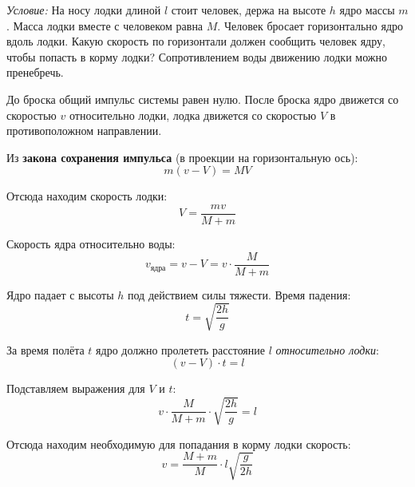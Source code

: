 \documentclass[a4paper,12pt]{article}
\begin{document}

\textit{Условие:} На носу лодки длиной $l$ стоит человек, держа на высоте $h$ ядро массы $m$. Масса лодки вместе с человеком равна $M$. Человек бросает горизонтально ядро вдоль лодки. Какую скорость по горизонтали должен сообщить человек ядру, чтобы попасть в корму лодки? Сопротивлением воды движению лодки можно пренебречь.

\vspace{2em}
До броска общий импульс системы равен нулю. После броска ядро движется со скоростью $v$ относительно лодки, лодка движется со скоростью $V$ в противоположном направлении.

\vspace{1em}
Из \textbf{закона сохранения импульса} (в проекции на горизонтальную ось):
\begin{equation}
    m(v - V) = MV
\end{equation}

Отсюда находим скорость лодки:
\begin{equation}
    V = \frac{mv}{M + m}
\end{equation}

Скорость ядра относительно воды:
\begin{equation}
    v_{\text{ядра}} = v - V = v \cdot \frac{M}{M + m}
\end{equation}

Ядро падает с высоты $h$ под действием силы тяжести. Время падения:
\begin{equation}
    t = \sqrt{\frac{2h}{g}}
\end{equation}

За время полёта $t$ ядро должно пролететь расстояние $l$ \textit{относительно лодки}:
\begin{equation}
    (v - V) \cdot t = l
\end{equation}

Подставляем выражения для $V$ и $t$:
\begin{equation}
    v \cdot \frac{M}{M + m} \cdot \sqrt{\frac{2h}{g}} = l
\end{equation} 

Отсюда находим необходимую для попадания в корму лодки скорость:
\begin{equation}
    \boxed{v = \frac{M + m}{M} \cdot l \sqrt{\frac{g}{2h}}}
\end{equation}
\end{document}

